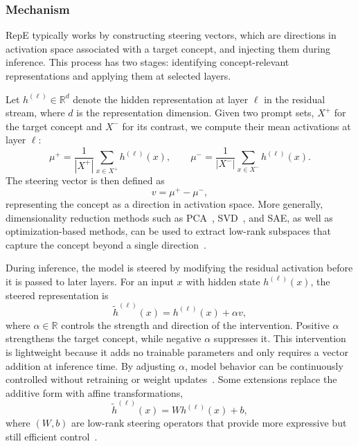 \subsubsection{Mechanism}
RepE typically works by constructing steering vectors, which are directions in activation space associated with a target concept, and injecting them during inference. This process has two stages: identifying concept-relevant representations and applying them at selected layers.

Let $h^{(\ell)} \in \mathbb{R}^d$ denote the hidden representation at layer $\ell$ in the residual stream, where $d$ is the representation dimension. Given two prompt sets, $X^{+}$ for the target concept and $X^{-}$ for its contrast, we compute their mean activations at layer $\ell$:
\[
\mu^{+} = \frac{1}{|X^{+}|} \sum_{x \in X^{+}} h^{(\ell)}(x),
\qquad
\mu^{-} = \frac{1}{|X^{-}|} \sum_{x \in X^{-}} h^{(\ell)}(x).
\]
The steering vector is then defined as
\[
v = \mu^{+} - \mu^{-},
\]
representing the concept as a direction in activation space. More generally, dimensionality reduction methods such as PCA~\citep{Jolliffe:1986}, SVD~\citep{Golub1971}, and SAE, as well as optimization-based methods, can be used to extract low-rank subspaces that capture the concept beyond a single direction~\citep{jiang2025msrs, turner2023steering, zhou2025compositional}.

During inference, the model is steered by modifying the residual activation before it is passed to later layers. For an input $x$ with hidden state $h^{(\ell)}(x)$, the steered representation is
\[
\tilde{h}^{(\ell)}(x) = h^{(\ell)}(x) + \alpha v,
\]
where $\alpha \in \mathbb{R}$ controls the strength and direction of the intervention. Positive $\alpha$ strengthens the target concept, while negative $\alpha$ suppresses it. This intervention is lightweight because it adds no trainable parameters and only requires a vector addition at inference time. By adjusting $\alpha$, model behavior can be continuously controlled without retraining or weight updates~\citep{turner2023steering}. Some extensions replace the additive form with affine transformations,
\[
\tilde{h}^{(\ell)}(x) = W h^{(\ell)}(x) + b,
\]
where $(W, b)$ are low-rank steering operators that provide more expressive but still efficient control~\citep{jiang2025msrs, zhou2025compositional}.




